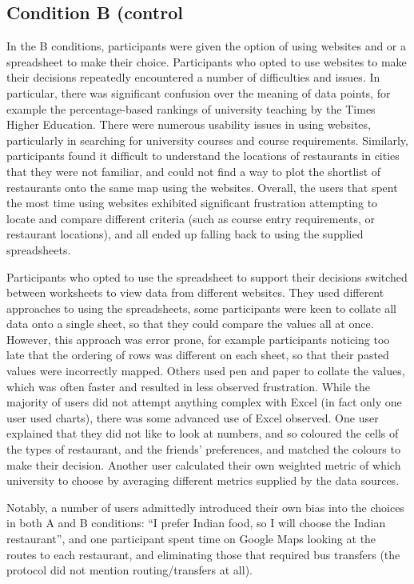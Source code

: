 \documentclass{sigchi}
\begin{document}
\subsection{Condition B (control}
In the B conditions, participants were given the option of using websites and or a spreadsheet to make their choice.  Participants who opted to use websites to make their decisions repeatedly encountered a number of difficulties and issues. In particular, there was significant confusion over the meaning of data points, for example the percentage-based rankings of university teaching by the Times Higher Education. There were numerous usability issues in using websites, particularly in searching for university courses and course requirements. Similarly, participants found it difficult to understand the locations of restaurants in cities that they were not familiar, and could not find a way to plot the shortlist of restaurants onto the same map using the websites. Overall, the users that spent the most time using websites exhibited significant frustration attempting to locate and compare different criteria (such as course entry requirements, or restaurant locations), and all ended up falling back to using the supplied spreadsheets.

Participants who opted to use the spreadsheet to support their decisions switched between worksheets to view data from different websites.  They used different approaches to using the spreadsheets, some participants were keen to collate all data onto a single sheet, so that they could compare the values all at once. However, this approach was error prone, for example participants noticing too late that the ordering of rows was different on each sheet, so that their pasted values were incorrectly mapped. Others used pen and paper to collate the values, which was often faster and resulted in less observed frustration. While the majority of users did not
attempt anything complex with Excel (in fact only one user used charts), there was some advanced use of Excel observed.
One user explained that they did not like to look at numbers, and so coloured the cells of the types of restaurant, and the
friends' preferences, and matched the colours to make their decision. Another user calculated their own weighted metric
of which university to choose by averaging different metrics supplied by the data sources.

Notably, a number of users admittedly introduced their own bias into the choices in both A and B conditions: ``I prefer Indian food, so I will choose the Indian restaurant'', and one participant spent time on Google Maps looking at the routes to each restaurant, and eliminating those that required bus transfers (the protocol did not mention routing/transfers at all).
\end{document}
